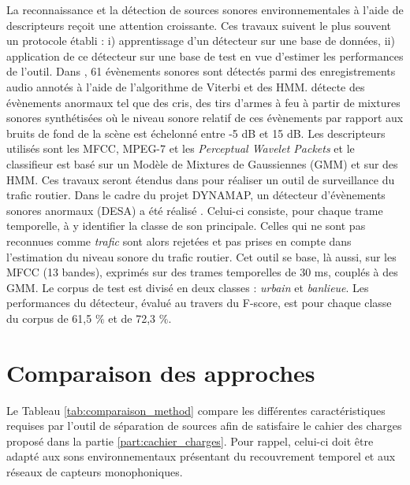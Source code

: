 La reconnaissance et la détection de sources sonores environnementales à l'aide de descripteurs \cite{dufaux2000automatic,defreville_automatic_2006} reçoit une attention croissante. Ces travaux suivent le plus souvent un protocole établi : i) apprentissage d'un détecteur sur une base de données, ii) application de ce détecteur sur une base de test en vue d'estimer les performances de l'outil. Dans \cite{mesaros2010acoustic}, 61 évènements sonores sont détectés parmi des enregistrements audio annotés à l'aide de l'algorithme de Viterbi et des HMM. \cite{ntalampiras2011probabilistic} détecte des évènements anormaux tel que des cris, des tirs d'armes à feu à partir de mixtures sonores synthétisées où le niveau sonore relatif de ces évènements par rapport aux bruits de fond de la scène est échelonné entre -5 dB et 15 dB. Les descripteurs utilisés sont les MFCC, MPEG-7 et les \textit{Perceptual Wavelet Packets} et le classifieur est basé sur un Modèle de Mixtures de Gaussiennes (GMM) et sur des HMM. Ces travaux seront étendus dans \cite{ntalampiras2014universal} pour réaliser un outil de surveillance du trafic routier. Dans le cadre du projet DYNAMAP, un détecteur d'évènements sonores anormaux (DESA) a été réalisé \cite{socoro2017anomalous}. Celui-ci consiste, pour chaque trame temporelle, à y identifier la classe de son principale. Celles qui ne sont pas reconnues comme \textit{trafic} sont alors rejetées et pas prises en compte dans l'estimation du niveau sonore du trafic routier. Cet outil se base, là aussi, sur les MFCC (13 bandes), exprimés sur des trames temporelles de 30 ms, couplés à des GMM. Le corpus de test est divisé en deux classes : \textit{urbain} et \textit{banlieue}. Les performances du détecteur, évalué au travers du F-score, est pour chaque classe du corpus de 61,5 $\%$ et de 72,3 $\%$.

\section{Comparaison des approches}\label{part:comparaison_method}

Le Tableau \ref{tab:comparaison_method} compare les différentes caractéristiques requises par l'outil de séparation de sources afin de satisfaire le cahier des charges proposé dans la partie \ref{part:cachier_charges}. Pour rappel, celui-ci doit être adapté aux sons environnementaux présentant du recouvrement temporel et aux réseaux de capteurs monophoniques.


